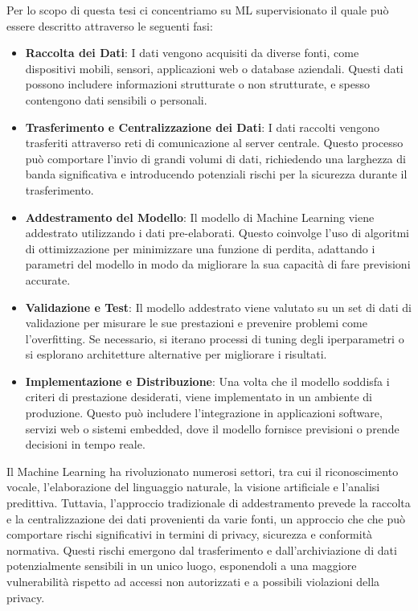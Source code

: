 \documentclass[a4paper, oneside, openright]{report}
\begin{document}
Per lo scopo di questa tesi ci concentriamo su ML supervisionato il quale può essere descritto attraverso le seguenti fasi:
\begin{itemize} 
    \item \textbf{Raccolta dei Dati}: I dati vengono acquisiti da diverse fonti, come dispositivi mobili, sensori, applicazioni web o database aziendali. Questi dati possono includere informazioni strutturate o non strutturate, e spesso contengono dati sensibili o personali.
   
    \item \textbf{Trasferimento e Centralizzazione dei Dati}: I dati raccolti vengono trasferiti attraverso reti di comunicazione al server centrale. Questo processo può comportare l'invio di grandi volumi di dati, richiedendo una larghezza di banda significativa e introducendo potenziali rischi per la sicurezza durante il trasferimento.
    
    \item \textbf{Addestramento del Modello}: Il modello di Machine Learning viene addestrato utilizzando i dati pre-elaborati. Questo coinvolge l'uso di algoritmi di ottimizzazione per minimizzare una funzione di perdita, adattando i parametri del modello in modo da migliorare la sua capacità di fare previsioni accurate.
    
    \item \textbf{Validazione e Test}: Il modello addestrato viene valutato su un set di dati di validazione per misurare le sue prestazioni e prevenire problemi come l'overfitting. Se necessario, si iterano processi di tuning degli iperparametri o si esplorano architetture alternative per migliorare i risultati.
    
    \item \textbf{Implementazione e Distribuzione}: Una volta che il modello soddisfa i criteri di prestazione desiderati, viene implementato in un ambiente di produzione. Questo può includere l'integrazione in applicazioni software, servizi web o sistemi embedded, dove il modello fornisce previsioni o prende decisioni in tempo reale.
\end{itemize}

Il Machine Learning ha rivoluzionato numerosi settori, tra cui il riconoscimento vocale, l'elaborazione del linguaggio naturale, la visione artificiale e l'analisi predittiva. Tuttavia, l'approccio tradizionale di addestramento prevede la raccolta e la centralizzazione dei dati provenienti da varie fonti, un approccio che che può comportare rischi significativi in termini di privacy, sicurezza e conformità normativa. Questi rischi emergono dal trasferimento e dall'archiviazione di dati potenzialmente sensibili in un unico luogo, esponendoli a una maggiore vulnerabilità rispetto ad accessi non autorizzati e a possibili violazioni della privacy.
\end{document}
